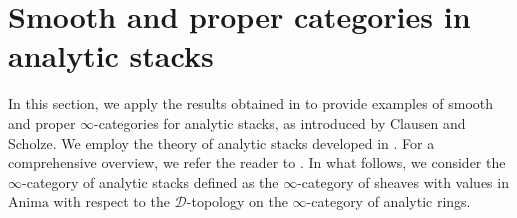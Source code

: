 \documentclass[oneside, hidelinks, 12pt, a4paper,reqno]{amsart}
\theoremstyle{plain}
\theoremstyle{definition}
\theoremstyle{plain}
\newcommand{\Spec}{\mathrm{Spec}}
\newcommand{\Perf}{\mathrm{Perf}}
\newcommand{\cat}{$\infty$-category }
\newcommand{\cates}{$\infty$-categories }
\newcommand{\catperf}{\mathrm{Cat}^{\Perf}}
\begin{document}

\section{Smooth and proper categories in analytic stacks}\label{Appendix 2}

In this section, we apply the results obtained in  to provide examples of smooth and proper \cates for analytic stacks, as introduced by Clausen and Scholze. We employ the theory of analytic stacks developed in \cite{Clausen_Scholze_lectures}. For a comprehensive overview, we refer the reader to \cite{kesting2025categoricalkunnethformulasanalytic}. In what follows, we consider the \cat of analytic stacks defined as the \cat of sheaves with values in $\mathrm{Anima}$ with respect to the $\mathscr{D}$-topology on the \cat of analytic rings.
\end{document}

